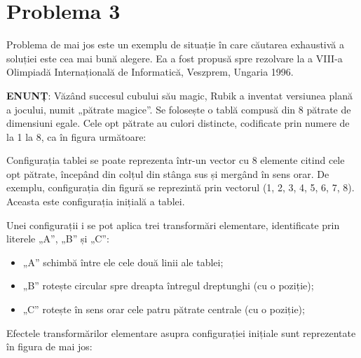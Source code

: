 \section{Problema 3}

Problema de mai jos este un exemplu de situație în care căutarea exhaustivă a
soluției este cea mai bună alegere. Ea a fost propusă spre rezolvare la a
VIII-a Olimpiadă Internațională de Informatică, Veszprem, Ungaria 1996.

{\bf ENUNȚ}: Văzând succesul cubului său magic, Rubik a inventat versiunea
plană a jocului, numit „pătrate magice”. Se folosește o tablă compusă din 8
pătrate de dimensiuni egale. Cele opt pătrate au culori distincte, codificate
prin numere de la 1 la 8, ca în figura următoare:


Configurația tablei se poate reprezenta într-un vector cu 8 elemente citind
cele opt pătrate, începând din colțul din stânga sus și mergând în sens
orar. De exemplu, configurația din figură se reprezintă prin vectorul (1, 2,
3, 4, 5, 6, 7, 8). Aceasta este configurația inițială a tablei.

Unei configurații i se pot aplica trei transformări elementare, identificate
prin literele „A”, „B” și „C”:

\begin{itemize}

\item „A”  schimbă între ele cele două linii ale tablei;

\item „B”  rotește circular spre dreapta întregul dreptunghi (cu o poziție);

\item „C”  rotește în sens orar cele patru pătrate centrale (cu o poziție);

\end{itemize}

Efectele transformărilor elementare asupra configurației inițiale sunt
reprezentate în figura de mai jos:

